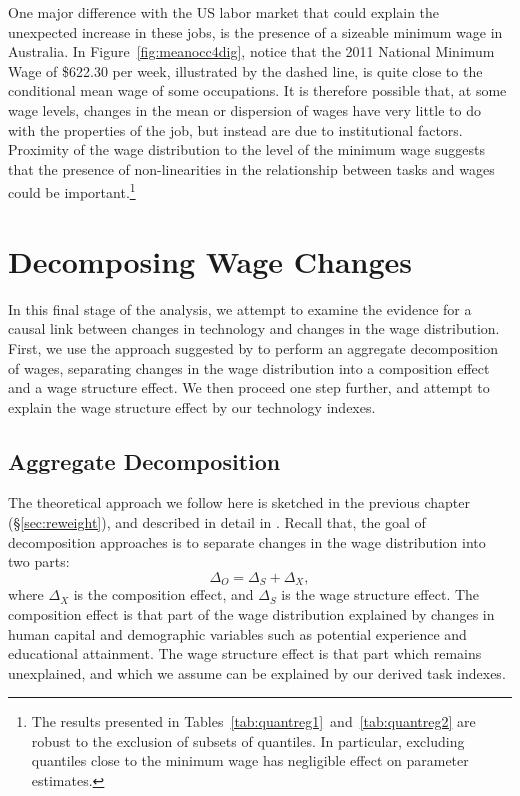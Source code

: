 One major difference with the US labor market that could explain the unexpected increase in these jobs, is the presence of a sizeable minimum wage in Australia. In Figure~\ref{fig:meanocc4dig}, notice that the 2011 National Minimum Wage of \$622.30 per week, illustrated by the dashed line, is quite close to the conditional mean wage of some occupations. It is therefore possible that, at some wage levels, changes in the mean or dispersion of wages have very little to do with the properties of the job, but instead are due to institutional factors. Proximity of the wage distribution to the level of the minimum wage suggests that the presence of non-linearities in the relationship between tasks and wages could be important.\footnote{The results presented in Tables~\ref{tab:quantreg1}~and~\ref{tab:quantreg2} are robust to the exclusion of subsets of quantiles. In particular, excluding quantiles close to the minimum wage has negligible effect on parameter estimates.}

\section{Decomposing Wage Changes}

In this final stage of the analysis, we attempt to examine the evidence for a causal link between changes in technology and changes in the wage distribution. First, we use the approach suggested by \citet{DiNardo1996} to perform an aggregate decomposition of wages, separating changes in the wage distribution into a composition effect and a wage structure effect. We then proceed one step further, and attempt to explain the wage structure effect by our technology indexes.

\subsection{Aggregate Decomposition} \label{sec:id}

The theoretical approach we follow here is sketched in the previous chapter (\S\ref{sec:reweight}), and described in detail in \citet{DiNardo1996}. Recall that, the goal of decomposition approaches is to separate changes in the wage distribution into two parts:
$$
\Delta_O = \Delta_S + \Delta_X,
$$
where $\Delta_X$ is the composition effect, and $\Delta_S$ is the wage structure effect. The composition effect is that part of the wage distribution explained by changes in human capital and demographic variables such as potential experience and educational attainment. The wage structure effect is that part which remains unexplained, and which we assume can be explained by our derived task indexes.

